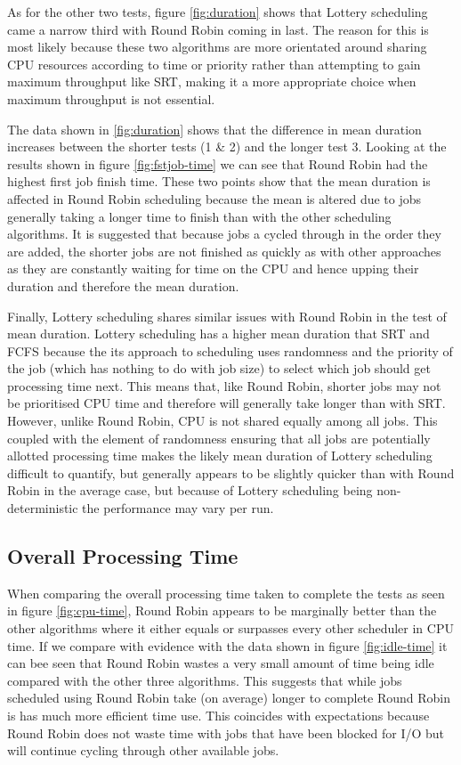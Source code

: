\documentclass{acm_proc_article-sp}
\begin{document}
As for the other two tests, figure \ref{fig:duration} shows that Lottery scheduling came a narrow third with Round Robin coming in last. The reason for this is most likely because these two algorithms are more orientated around sharing CPU resources according to time or priority rather than attempting to gain maximum throughput like SRT, making it a more appropriate choice when maximum throughput is not essential.

The data shown in \ref{fig:duration} shows that the difference in mean duration increases between the shorter tests (1 \& 2) and the longer test 3. Looking at the results shown in figure \ref{fig:fstjob-time} we can see that Round Robin had the highest first job finish time. These two points show that the mean duration is affected in Round Robin scheduling because the mean is altered due to jobs generally taking a longer time to finish than with the other scheduling algorithms. It is suggested that because jobs a cycled through in the order they are added, the shorter jobs are not finished as quickly as with other approaches as they are constantly waiting for time on the CPU and hence upping their duration and therefore the mean duration.

Finally, Lottery scheduling shares similar issues with Round Robin in the test of mean duration. Lottery scheduling has a higher mean duration that SRT and FCFS because the its approach to scheduling uses randomness and the priority of the job (which has nothing to do with job size) to select which job should get processing time next. This means that, like Round Robin, shorter jobs may not be prioritised CPU time and therefore will generally take longer than with SRT. However, unlike Round Robin, CPU is not shared equally among all jobs. This coupled with the element of randomness ensuring that all jobs are potentially allotted processing time makes the likely mean duration of Lottery scheduling difficult to quantify, but generally appears to be slightly quicker than with Round Robin in the average case, but because of Lottery scheduling being non-deterministic the performance may vary per run.

\subsection{Overall Processing Time}
When comparing the overall processing time taken to complete the tests as seen in figure \ref{fig:cpu-time}, Round Robin appears to be marginally better than the other algorithms where it either equals or surpasses every other scheduler in CPU time. If we compare with evidence with the data shown in figure \ref{fig:idle-time} it can bee seen that Round Robin wastes a very small amount of time being idle compared with the other three algorithms. This suggests that while jobs scheduled using Round Robin take (on average) longer to complete Round Robin is has much more efficient time use. This coincides with expectations because Round Robin does not waste time with jobs that have been blocked for I/O but will continue cycling through other available jobs.
\end{document}
